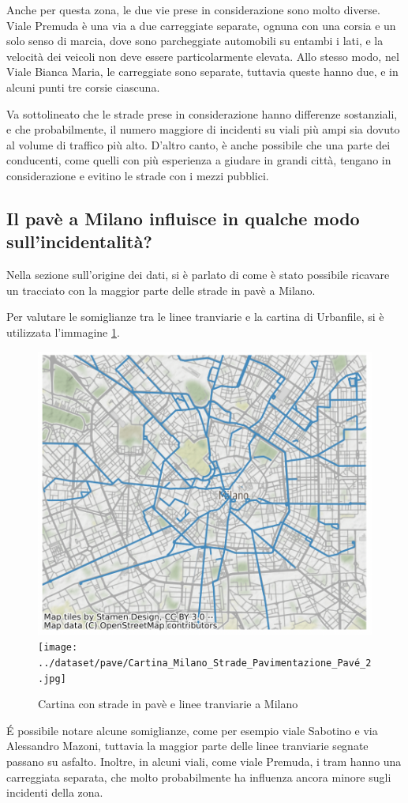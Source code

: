 \documentclass[a4paper,12pt]{report}
\begin{document}
Anche per questa zona, le due vie prese in considerazione sono molto diverse.
Viale Premuda è una via a due carreggiate separate, ognuna con una corsia e un solo senso 
di marcia, dove sono parcheggiate automobili su entambi i lati, e la velocità dei 
veicoli non deve essere particolarmente elevata.
Allo stesso modo, nel Viale Bianca Maria, le carreggiate sono separate, tuttavia queste 
hanno due, e in alcuni punti tre corsie ciascuna. 

Va sottolineato che le strade prese in considerazione hanno differenze sostanziali, e che 
probabilmente, il numero maggiore di incidenti su viali più ampi sia dovuto al 
volume di traffico più alto.
D'altro canto, è anche possibile che una parte dei conducenti, come quelli con più esperienza 
a giudare in grandi città, tengano in considerazione e evitino le strade con i mezzi pubblici.

\subsection{Il pavè a Milano influisce in qualche modo sull'incidentalità?}

Nella sezione sull'origine dei dati, si è parlato di come è stato possibile ricavare 
un tracciato con la maggior parte delle strade in pavè a Milano.

Per valutare le somiglianze tra le linee tranviarie e la cartina di 
Urbanfile, si è utilizzata l'immagine \ref{fig:tram-pave-milano}.

\begin{figure}
    \includegraphics[width=0.48\linewidth]{../src/tram/tram_milano.png}
    \texttt{[image: ../dataset/pave/Cartina\_Milano\_Strade\_Pavimentazione\_Pavé\_2.jpg]}
    \caption{Cartina con strade in pavè e linee tranviarie a Milano}
    \label{fig:tram-pave-milano}
\end{figure}

\'E possibile notare alcune somiglianze, come per esempio viale Sabotino e via 
Alessandro Mazoni, tuttavia la maggior parte delle linee tranviarie segnate 
passano su asfalto.
Inoltre, in alcuni viali, come viale Premuda, i tram hanno una carreggiata separata, 
che molto probabilmente ha influenza ancora minore sugli incidenti della zona.
\end{document}
